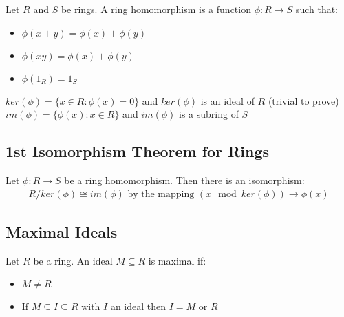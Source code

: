 \documentclass[11pt]{article}
\begin{document}
\begin{defn}
Let $R$ and $S$ be rings. 
A ring homomorphism is a function $\phi : R \rightarrow S$ such that:
	\begin{itemize}
		\item{$\phi(x+y) = \phi(x) + \phi(y)$}
		\item{$\phi(xy) = \phi(x) + \phi(y)$}
		\item{$\phi(1_R) = 1_S$}
	\end{itemize}
	$ $\\
	$ker(\phi) = \{ x \in R : \phi (x) =0 \}$ and $ker(\phi)$ is an ideal of $R$ (trivial to prove) \\
	$im(\phi) = \{ \phi(x) : x \in R\}$ and $im(\phi)$ is a subring of $S$
\end{defn}


\subsection{1st Isomorphism Theorem for Rings}

Let $\phi : R \rightarrow S$ be a ring homomorphism. 
Then there is an isomorphism:
\begin{align*}
	R/ker(\phi) \cong im(\phi) \text{ by the mapping } (x\mod ker(\phi)) \rightarrow \phi(x)
\end{align*}

\subsection{Maximal Ideals}

\begin{defn}
Let $R$ be a ring.
An ideal $M \subseteq R$ is maximal if:
	\begin{itemize}
		\item{$M \neq R$}
		\item{If $M \subseteq I \subseteq R $ with $I$ an ideal then $I=M $ or $R$}
	\end{itemize}
\end{defn}
\end{document}
